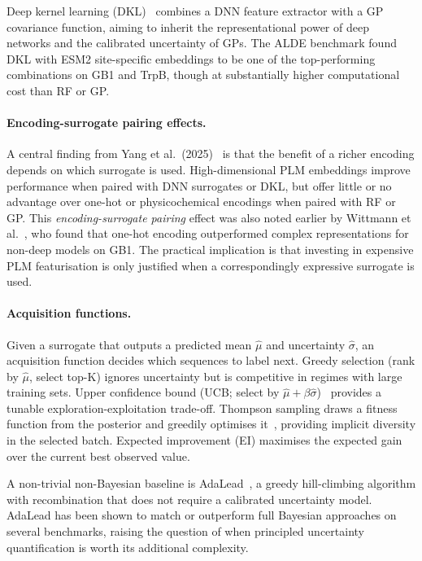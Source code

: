 \documentclass[english, 12pt, a4paper, elec, utf8, a-2b, online]{aaltothesis}
\begin{document}
Deep kernel learning (DKL)~\cite{Yang2025} combines a DNN feature extractor with a GP covariance
function, aiming to inherit the representational power of deep networks and the calibrated
uncertainty of GPs.
The ALDE benchmark found DKL with ESM2 site-specific embeddings to be one of the top-performing
combinations on GB1 and TrpB, though at substantially higher computational cost than RF or GP.

\paragraph{Encoding-surrogate pairing effects.}
A central finding from Yang et al.~(2025)~\cite{Yang2025} is that the benefit of a richer
encoding depends on which surrogate is used.
High-dimensional PLM embeddings improve performance when paired with DNN surrogates or DKL,
but offer little or no advantage over one-hot or physicochemical encodings when paired with RF or GP.
This \emph{encoding-surrogate pairing} effect was also noted earlier by Wittmann
et al.~\cite{Wittmann2021}, who found that one-hot encoding outperformed complex representations
for non-deep models on GB1.
The practical implication is that investing in expensive PLM featurisation is only justified
when a correspondingly expressive surrogate is used.

\paragraph{Acquisition functions.}
Given a surrogate that outputs a predicted mean $\hat{\mu}$ and uncertainty $\hat{\sigma}$,
an acquisition function decides which sequences to label next.
Greedy selection (rank by $\hat{\mu}$, select top-K) ignores uncertainty but is competitive
in regimes with large training sets.
Upper confidence bound (UCB; select by $\hat{\mu} + \beta\hat{\sigma}$)~\cite{Srinivas2010}
provides a tunable exploration-exploitation trade-off.
Thompson sampling draws a fitness function from the posterior and greedily optimises
it~\cite{Yang2025}, providing implicit diversity in the selected batch.
Expected improvement (EI) maximises the expected gain over the current best observed value.

A non-trivial non-Bayesian baseline is AdaLead~\cite{Sinai2020}, a greedy hill-climbing
algorithm with recombination that does not require a calibrated uncertainty model.
AdaLead has been shown to match or outperform full Bayesian approaches on several benchmarks,
raising the question of when principled uncertainty quantification is worth its additional
complexity.
\end{document}
